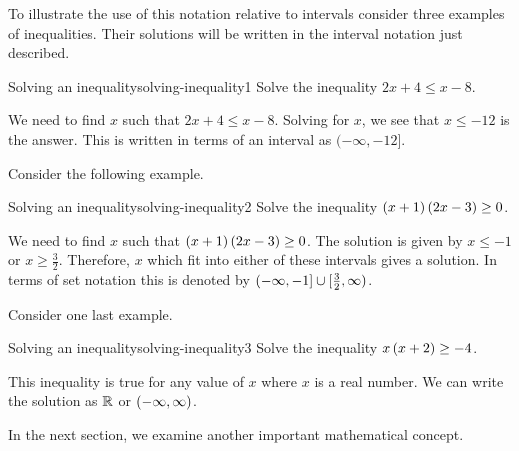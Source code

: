 To illustrate the use of this notation relative to intervals consider three
examples of inequalities. Their solutions will be written in the interval notation
just described.

\begin{example}{Solving an inequality}{solving-inequality1}
Solve the inequality $2x+4\leq x-8$.
\end{example}

\begin{solution}
We need to find $x$ such that $2x+4\leq x-8$. Solving for $x$, we see that 
$x\leq -12$ is the answer. This is written in terms of an interval as $(-\infty ,-12]$.
\end{solution}

Consider the following example.

\begin{example}{Solving an inequality}{solving-inequality2}
Solve the inequality $\left(x+1\right) \left(2x-3\right) \geq0$.
\end{example}

\begin{solution}
We need to find $x$ such that $\left(x+1\right) \left(2x-3\right) \geq0$. 
The solution is given by  $x\leq -1$ or $x\geq \frac{3}{2}$. Therefore, 
$x$ which fit into either of these intervals gives a solution. In terms of set notation this is denoted by $(-\infty ,-1]\cup
[ \vspace{0.05in}\frac{3}{2},\infty )$.
\end{solution}

Consider one last example.

\begin{example}{Solving an inequality}{solving-inequality3}
Solve the inequality $x \left(x+2\right) \geq-4$.
\end{example}

\begin{solution}
This inequality is true for any value of $x$ where $x$ is a real number. We can write the solution as $\mathbb{R}$ or $\left(
-\infty ,\infty \right) $.
\end{solution}

In the next section, we examine another important mathematical concept.
